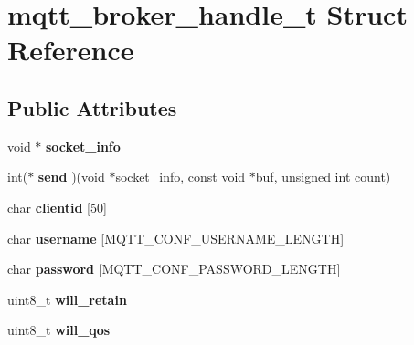 \hypertarget{structmqtt__broker__handle__t}{}\section{mqtt\+\_\+broker\+\_\+handle\+\_\+t Struct Reference}
\label{structmqtt__broker__handle__t}
\subsection*{Public Attributes}
\begin{DoxyCompactItemize}
\item 
\hypertarget{structmqtt__broker__handle__t_a92aed5f346d3407642bf44950727393f}{}void $\ast$ {\bfseries socket\+\_\+info}\label{structmqtt__broker__handle__t_a92aed5f346d3407642bf44950727393f}

\item 
\hypertarget{structmqtt__broker__handle__t_a6ba16eeee3364246f62f48650c2304e9}{}int($\ast$ {\bfseries send} )(void $\ast$socket\+\_\+info, const void $\ast$buf, unsigned int count)\label{structmqtt__broker__handle__t_a6ba16eeee3364246f62f48650c2304e9}

\item 
\hypertarget{structmqtt__broker__handle__t_a5775a5d98521617889eec376cd6e7ef2}{}char {\bfseries clientid} \mbox{[}50\mbox{]}\label{structmqtt__broker__handle__t_a5775a5d98521617889eec376cd6e7ef2}

\item 
\hypertarget{structmqtt__broker__handle__t_a8e3bd673bce26ab301a72ca83850284a}{}char {\bfseries username} \mbox{[}M\+Q\+T\+T\+\_\+\+C\+O\+N\+F\+\_\+\+U\+S\+E\+R\+N\+A\+M\+E\+\_\+\+L\+E\+N\+G\+T\+H\mbox{]}\label{structmqtt__broker__handle__t_a8e3bd673bce26ab301a72ca83850284a}

\item 
\hypertarget{structmqtt__broker__handle__t_ae1d422e8ee6e24a933caf1c5629b7ad9}{}char {\bfseries password} \mbox{[}M\+Q\+T\+T\+\_\+\+C\+O\+N\+F\+\_\+\+P\+A\+S\+S\+W\+O\+R\+D\+\_\+\+L\+E\+N\+G\+T\+H\mbox{]}\label{structmqtt__broker__handle__t_ae1d422e8ee6e24a933caf1c5629b7ad9}

\item 
\hypertarget{structmqtt__broker__handle__t_a8c13600b493f9de4c681e8f613174e26}{}uint8\+\_\+t {\bfseries will\+\_\+retain}\label{structmqtt__broker__handle__t_a8c13600b493f9de4c681e8f613174e26}

\item 
\hypertarget{structmqtt__broker__handle__t_a9e072b6ccb3d43b3900915b4a7a6de5b}{}uint8\+\_\+t {\bfseries will\+\_\+qos}\label{structmqtt__broker__handle__t_a9e072b6ccb3d43b3900915b4a7a6de5b}


\end{DoxyCompactItemize}
